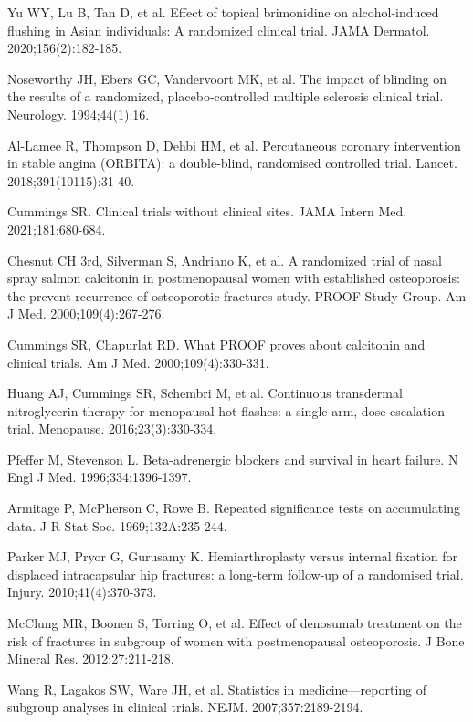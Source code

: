 \begin{references}
\item Yu WY, Lu B, Tan D, et al. Effect of topical brimonidine on alcohol-induced flushing in Asian individuals: A randomized clinical trial. JAMA Dermatol. 2020;156(2):182-185.
\item Noseworthy JH, Ebers GC, Vandervoort MK, et al. The impact of blinding on the results of a randomized, placebo‐controlled multiple sclerosis clinical trial. Neurology. 1994;44(1):16.
\item Al-Lamee R, Thompson D, Dehbi HM, et al. Percutaneous coronary intervention in stable angina (ORBITA): a double-blind, randomised controlled trial. Lancet. 2018;391(10115):31-40.
\item Cummings SR. Clinical trials without clinical sites. JAMA Intern Med. 2021;181:680-684.
\item Chesnut CH 3rd, Silverman S, Andriano K, et al. A randomized trial of nasal spray salmon calcitonin in postmenopausal women with established osteoporosis: the prevent recurrence of osteoporotic fractures study. PROOF Study Group. Am J Med. 2000;109(4):267-276.
\item Cummings SR, Chapurlat RD. What PROOF proves about calcitonin and clinical trials. Am J Med. 2000;109(4):330-331.
\item Huang AJ, Cummings SR, Schembri M, et al. Continuous transdermal nitroglycerin therapy for menopausal hot flashes: a single-arm, dose-escalation trial. Menopause. 2016;23(3):330-334.
\item Pfeffer M, Stevenson L. Beta-adrenergic blockers and survival in heart failure. N Engl J Med. 1996;334:1396-1397.
\item Armitage P, McPherson C, Rowe B. Repeated significance tests on accumulating data. J R Stat Soc. 1969;132A:235-244.
\item Parker MJ, Pryor G, Gurusamy K. Hemiarthroplasty versus internal fixation for displaced intracapsular hip fractures: a long-term follow-up of a randomised trial. Injury. 2010;41(4):370-373.
\item McClung MR, Boonen S, Torring O, et al. Effect of denosumab treatment on the risk of fractures in subgroup of women with postmenopausal osteoporosis. J Bone Mineral Res. 2012;27:211-218.
\item Wang R, Lagakos SW, Ware JH, et al. Statistics in medicine—reporting of subgroup analyses in clinical trials. NEJM. 2007;357:2189-2194.
\end{references}
